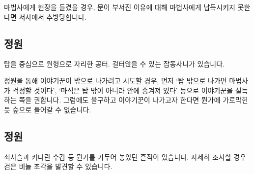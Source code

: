\documentclass{report}
\begin{document}
		마법사에게 현장을 들켰을 경우, 문이 부서진 이유에 대해 마법사에게 납득시키지 못한다면 서사에서 추방당합니다.
	
	\subsection*{정원}
		탑을 중심으로 원형으로 자리한 공터. 걸터앉을 수 있는 잡동사니가 있습니다.
		
		정원을 통해 이야기꾼이 밖으로 나가려고 시도할 경우, 먼저 `탑 밖으로 나가면 마법사가 걱정할 것이다', `마석은 탑 밖이 아니라 안에 숨겨져 있다' 등으로 이야기꾼을 설득하는 쪽을 권합니다. 그럼에도 불구하고 이야기꾼이 나가고자 한다면 뭔가에 가로막힌 듯 숲으로 들어갈 수 없습니다.
	
	\subsection*{정원}
		쇠사슬과 커다란 수갑 등 뭔가를 가두어 놓았던 흔적이 있습니다. 자세히 조사할 경우 \hypertarget{black-scale}{검은 비늘 조각}을 발견할 수 있습니다.
	
\end{document}
